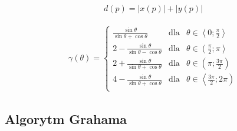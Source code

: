         \begin{align}
        	d\left(p\right) = \left|x\left(p\right)\right| + \left|y\left(p\right)\right|
        \end{align}
        
        \begin{align}
        	\gamma\left(
        		\theta
        	\right) = 
        		\left\{
        			\begin{array}{lcl}
        				\frac{
        					\sin\theta
        				}{
							\sin\theta + \cos\theta        			
        				} & 
        					\text{dla} &
        					\theta \in \left\langle
        						0;
        						\frac{
        							\pi
        						}{
									2        						
        						}
        					\right\rangle\\
        				2
        				- \frac{
        					\sin\theta
        				}{
							\sin\theta - \cos\theta        			
        				} & 
        					\text{dla} &
        					\theta \in \left(
        						\frac{
        							\pi
        						}{
									2        						
        						};
        						\pi
        					\right\rangle\\
        				2
        				+ \frac{
        					\sin\theta
        				}{
							\sin\theta + \cos\theta        			
        				} & 
        					\text{dla} &
        					\theta \in \left(
        						\pi;
        						\frac{
        							3\pi
        						}{
									2        						
        						}
        					\right)\\
        				4
        				- \frac{
        					\sin\theta
        				}{
							\sin\theta + \cos\theta        			
        				} & 
        					\text{dla} &
        					\theta \in \left\langle
        						\frac{
        							3\pi
        						}{
									2        						
        						};
        						2\pi
        					\right)\\
        			\end{array}
        		\right.      		
        \end{align}
        \begin{center}
        	
        \end{center}
       
              
        \subsection{Algorytm Grahama}
        
       
